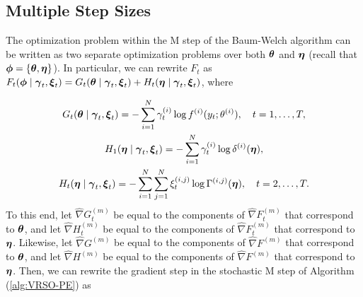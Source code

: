 



\subsection{Multiple Step Sizes}

The optimization problem within the M step of the Baum-Welch algorithm can be written as two separate optimization problems over both $\boldsymbol{\theta}$ and $\boldsymbol{\eta}$ (recall that $\boldsymbol{\phi} = \{\boldsymbol{\theta},\boldsymbol{\eta}\}$). In particular, we can rewrite $F_t$ as $F_t(\boldsymbol{\phi} \mid \boldsymbol{\gamma}_t,  \boldsymbol{\xi}_t) = G_t(\boldsymbol{\theta} \mid  \boldsymbol{\gamma}_t,  \boldsymbol{\xi}_t) + H_t(\boldsymbol{\eta} \mid  \boldsymbol{\gamma}_t,  \boldsymbol{\xi}_t)$, where

\begin{gather}
    G_t(\boldsymbol{\theta} \mid  \boldsymbol{\gamma}_t,  \boldsymbol{\xi}_t) = - \sum_{i=1}^N  \gamma^{(i)}_t \log f^{(i)}(y_t;\theta^{(i)}), \quad t = 1,\ldots,T, \\
    H_1(\boldsymbol{\eta} \mid  \boldsymbol{\gamma}_t,  \boldsymbol{\xi}_t) = - \sum_{i=1}^N  \gamma^{(i)}_t \log \delta^{(i)}(\boldsymbol{\eta}), \\
    H_t(\boldsymbol{\eta} \mid  \boldsymbol{\gamma}_t,  \boldsymbol{\xi}_t) =  - \sum_{i=1}^N \sum_{j=1}^N  \xi^{(i,j)}_t \log \Gamma^{(i,j)}(\boldsymbol{\eta}), \quad t = 2,\ldots,T.
\end{gather}
%
To this end, let $\widehat \nabla G^{(m)}_{t}$ be equal to the components of $\widehat \nabla F^{(m)}_{t}$ that correspond to $\boldsymbol{\theta}$, and let $\widehat \nabla H^{(m)}_{t}$ be equal to the components of $\widehat \nabla F^{(m)}_{t}$ that correspond to $\boldsymbol{\eta}$. Likewise, let $\widehat \nabla G^{(m)}$ be equal to the components of $\widehat \nabla F^{(m)}$ that correspond to $\boldsymbol{\theta}$, and let $\widehat \nabla H^{(m)}$ be equal to the components of $\widehat \nabla F^{(m)}$ that correspond to $\boldsymbol{\eta}$. Then, we can rewrite the gradient step in the stochastic M step of Algorithm (\ref{alg:VRSO-PE}) as

